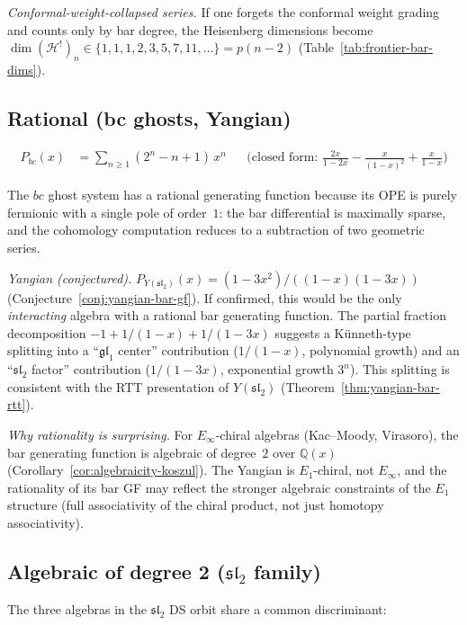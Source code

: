\emph{Conformal-weight-collapsed series.} If one forgets the conformal weight grading and counts only by bar degree, the Heisenberg dimensions become $\dim(\mathcal{H}^!)_n \in \{1, 1, 1, 2, 3, 5, 7, 11, \ldots\} = p(n-2)$ (Table~\ref{tab:frontier-bar-dims}).

\subsection{Rational (bc ghosts, Yangian)}
\label{subsec:gf-rational}

\begin{align}
P_{bc}(x) &= \sum_{n \geq 1}(2^n - n + 1)\,x^n
&&\text{(closed form: $\frac{2x}{1-2x} - \frac{x}{(1-x)^2} + \frac{x}{1-x}$)}
\label{eq:bc-gf}
\end{align}

The $bc$ ghost system has a rational generating function because its OPE is purely fermionic with a single pole of order~$1$: the bar differential is maximally sparse, and the cohomology computation reduces to a subtraction of two geometric series.

\emph{Yangian (conjectured).}
$P_{Y(\mathfrak{sl}_2)}(x) = (1-3x^2)/((1-x)(1-3x))$ (Conjecture~\ref{conj:yangian-bar-gf}). If confirmed, this would be the only \emph{interacting} algebra with a rational bar generating function. The partial fraction decomposition $-1 + 1/(1-x) + 1/(1-3x)$ suggests a K\"unneth-type splitting into a ``$\mathfrak{gl}_1$ center'' contribution ($1/(1-x)$, polynomial growth) and an ``$\mathfrak{sl}_2$ factor'' contribution ($1/(1-3x)$, exponential growth $3^n$). This splitting is consistent with the RTT presentation of $Y(\mathfrak{sl}_2)$ (Theorem~\ref{thm:yangian-bar-rtt}).

\emph{Why rationality is surprising.}
For $E_\infty$-chiral algebras (Kac--Moody, Virasoro), the bar generating function is algebraic of degree~$2$ over $\mathbb{Q}(x)$ (Corollary~\ref{cor:algebraicity-koszul}). The Yangian is $E_1$-chiral, not $E_\infty$, and the rationality of its bar GF may reflect the stronger algebraic constraints of the $E_1$ structure (full associativity of the chiral product, not just homotopy associativity).

\subsection{Algebraic of degree 2 ($\mathfrak{sl}_2$ family)}
\label{subsec:gf-algebraic}

The three algebras in the $\mathfrak{sl}_2$ DS orbit share a common discriminant:

